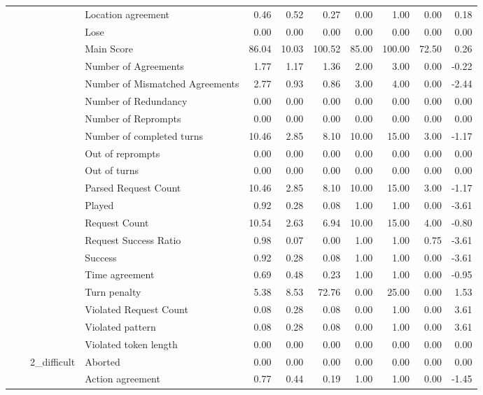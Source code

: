 \begin{tabular}{llllrrrrrrr}
 &  &  & Location agreement & 0.46 & 0.52 & 0.27 & 0.00 & 1.00 & 0.00 & 0.18 \\
 &  &  & Lose & 0.00 & 0.00 & 0.00 & 0.00 & 0.00 & 0.00 & 0.00 \\
 &  &  & Main Score & 86.04 & 10.03 & 100.52 & 85.00 & 100.00 & 72.50 & 0.26 \\
 &  &  & Number of Agreements & 1.77 & 1.17 & 1.36 & 2.00 & 3.00 & 0.00 & -0.22 \\
 &  &  & Number of Mismatched Agreements & 2.77 & 0.93 & 0.86 & 3.00 & 4.00 & 0.00 & -2.44 \\
 &  &  & Number of Redundancy & 0.00 & 0.00 & 0.00 & 0.00 & 0.00 & 0.00 & 0.00 \\
 &  &  & Number of Reprompts & 0.00 & 0.00 & 0.00 & 0.00 & 0.00 & 0.00 & 0.00 \\
 &  &  & Number of completed turns & 10.46 & 2.85 & 8.10 & 10.00 & 15.00 & 3.00 & -1.17 \\
 &  &  & Out of reprompts & 0.00 & 0.00 & 0.00 & 0.00 & 0.00 & 0.00 & 0.00 \\
 &  &  & Out of turns & 0.00 & 0.00 & 0.00 & 0.00 & 0.00 & 0.00 & 0.00 \\
 &  &  & Parsed Request Count & 10.46 & 2.85 & 8.10 & 10.00 & 15.00 & 3.00 & -1.17 \\
 &  &  & Played & 0.92 & 0.28 & 0.08 & 1.00 & 1.00 & 0.00 & -3.61 \\
 &  &  & Request Count & 10.54 & 2.63 & 6.94 & 10.00 & 15.00 & 4.00 & -0.80 \\
 &  &  & Request Success Ratio & 0.98 & 0.07 & 0.00 & 1.00 & 1.00 & 0.75 & -3.61 \\
 &  &  & Success & 0.92 & 0.28 & 0.08 & 1.00 & 1.00 & 0.00 & -3.61 \\
 &  &  & Time agreement & 0.69 & 0.48 & 0.23 & 1.00 & 1.00 & 0.00 & -0.95 \\
 &  &  & Turn penalty & 5.38 & 8.53 & 72.76 & 0.00 & 25.00 & 0.00 & 1.53 \\
 &  &  & Violated Request Count & 0.08 & 0.28 & 0.08 & 0.00 & 1.00 & 0.00 & 3.61 \\
 &  &  & Violated pattern & 0.08 & 0.28 & 0.08 & 0.00 & 1.00 & 0.00 & 3.61 \\
 &  &  & Violated token length & 0.00 & 0.00 & 0.00 & 0.00 & 0.00 & 0.00 & 0.00 \\
\cline{3-11}
 &  & \multirow[t]{27}{*}{2_difficult} & Aborted & 0.00 & 0.00 & 0.00 & 0.00 & 0.00 & 0.00 & 0.00 \\
 &  &  & Action agreement & 0.77 & 0.44 & 0.19 & 1.00 & 1.00 & 0.00 & -1.45 \\

\end{tabular}
